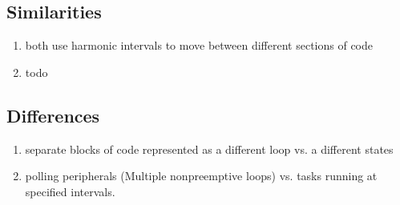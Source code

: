 \begin{comment}
  Multiple Nonpreemptive Loops with Interrupts (cont’d)
• Advantages:
– Guaranteed minimum polling frequency for each
input or device
– Guaranteed maximum response time for polled
inputs and devices
– External events are handled promptly and
deterministically using hardware-triggered interrupts.
• Disadvantages:
– Some devices may be polled faster than necessary,
which is wasteful of the processor’s time.
– The one software thread has less cohesion because
it now handles more than one loop. A state variable
keeps track of the timer ISR calls and the active loop.

\end{comment}


\subsection*{Similarities}
\begin{enumerate}
  \item both use harmonic intervals to move between different sections of code
  \item todo
\end{enumerate}\todo{}

\subsection*{Differences}
\begin{enumerate}
  \item separate blocks of code represented as a different loop vs. a different
    states
  \item polling peripherals (Multiple nonpreemptive loops) vs. tasks running at
    specified intervals.
\end{enumerate}

